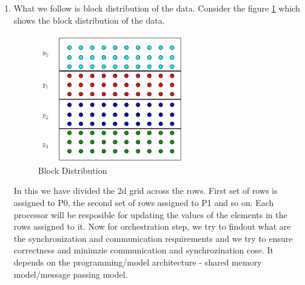 \documentclass[12pt]{article}
\begin{document}
\begin{enumerate}
\item What we follow is block distribution of the data. Consider the figure \ref{fig:block} which shows the block distribution of the data.
\begin{figure}[H]
    \centering
    \includegraphics[width=0.6\textwidth]{images/block.png}
    \caption{Block Distribution}
    \label{fig:block}
\end{figure}
In this we have divided the 2d grid across the rows. First set of rows is assigned to P0, the second set of rows assigned to P1 and so on. Each processor will be resposible 
for updating the values of the elements in the rows assigned to it. Now for orchestration step, we try to findout what are the synchronization and communication requirements and we try to ensure correctness and minimzie communication and synchrozination cose.
It depends on the programming/model architecture - shared memory model/message passing model. 
\end{enumerate}
\end{document}
